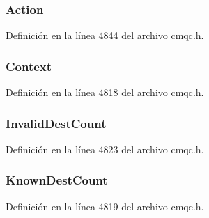 \subsubsection[{Action}]{ Action}\label{structtag_m_q_p_m_o_ac3faa33ea60209cfd14ccd29ef325788}


Definición en la línea 4844 del archivo cmqc.\+h.

\hypertarget{structtag_m_q_p_m_o_aa4e5a2da2b7009e9a1cb3afa41140718}{}
\subsubsection[{Context}]{ Context}\label{structtag_m_q_p_m_o_aa4e5a2da2b7009e9a1cb3afa41140718}


Definición en la línea 4818 del archivo cmqc.\+h.

\hypertarget{structtag_m_q_p_m_o_af76c4c4a710793e086829eac1c995d36}{}
\subsubsection[{Invalid\+Dest\+Count}]{ Invalid\+Dest\+Count}\label{structtag_m_q_p_m_o_af76c4c4a710793e086829eac1c995d36}


Definición en la línea 4823 del archivo cmqc.\+h.

\hypertarget{structtag_m_q_p_m_o_ab63679527a2a808aa8c189eeca5d0712}{}
\subsubsection[{Known\+Dest\+Count}]{ Known\+Dest\+Count}\label{structtag_m_q_p_m_o_ab63679527a2a808aa8c189eeca5d0712}


Definición en la línea 4819 del archivo cmqc.\+h.

\hypertarget{structtag_m_q_p_m_o_a9daf07c64f152de0db1a09b8033a87d5}{}
